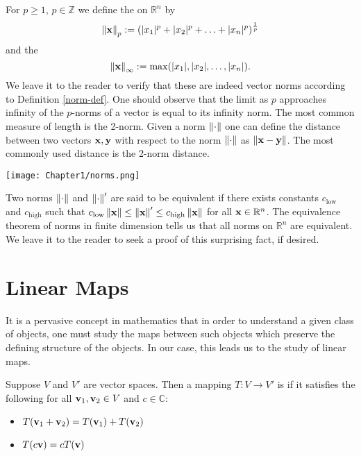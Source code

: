 \begin{example}

For $p\geq 1$, $p\in\mathbb{Z}$ we define the  on $\mathbb{R}^n$ by
\begin{equation}
    \norm{\vx}_p : = (|x_1|^p + |x_2|^p + \ldots + |x_n|^p)^{\frac{1}{p}}
\end{equation}
and the 
\begin{equation}
    \norm{\vx}_{\infty} : = \max (|x_1|, |x_2|, \ldots, |x_n|).
\end{equation}
We leave it to the reader to verify that these are indeed vector norms according to Definition \ref{norm-def}. One should observe that the limit as $p$ approaches infinity of the $p$-norms of a vector is equal to its infinity norm. The most common measure of length is the 2-norm. Given a norm $\norm{\cdot}$ one can define the distance between two vectors $\vx,\vy$ with respect to the norm $\norm{\cdot}$ as $\norm{\vx-\vy}$. The most commonly used distance is the 2-norm distance.
\end{example}

\begin{center}
  \texttt{[image: Chapter1/norms.png]}
\end{center}


Two norms $\norm{\cdot}$ and $\norm{\cdot}'$ are said to be equivalent if there exists constants $c_{\text{low}}$ and $c_{\text{high}}$ such that 
$c_{\text{low}} \norm{\vx} \leq \norm{\vx}' \leq c_{\text{high}} \norm{\vx}$
for all $\vx \in \mathbb R^n$. The equivalence theorem of norms in finite dimension tells us that all norms on $\mathbb R^n$ are equivalent. We leave it to the reader to seek a proof of this surprising fact, if desired.

\section{Linear Maps}

It is a pervasive concept in mathematics that in order to understand a given class of objects, one must study the maps between such objects which preserve the defining structure of the objects. In our case, this leads us to the study of linear maps.

\begin{definition}\label{linear-def}
Suppose $V$ and $V'$ are vector spaces. Then a mapping $T : V \rightarrow V'$ is  if it satisfies the following for all $\vv_1, \vv_2 \in V$ and $c \in \mathbb C$:
\begin{itemize}
\item $T(\vv_1 + \vv_2) = T(\vv_1) + T(\vv_2)$
\item $T(c\vv) = c T(\vv)$
\end{itemize}
\end{definition}


